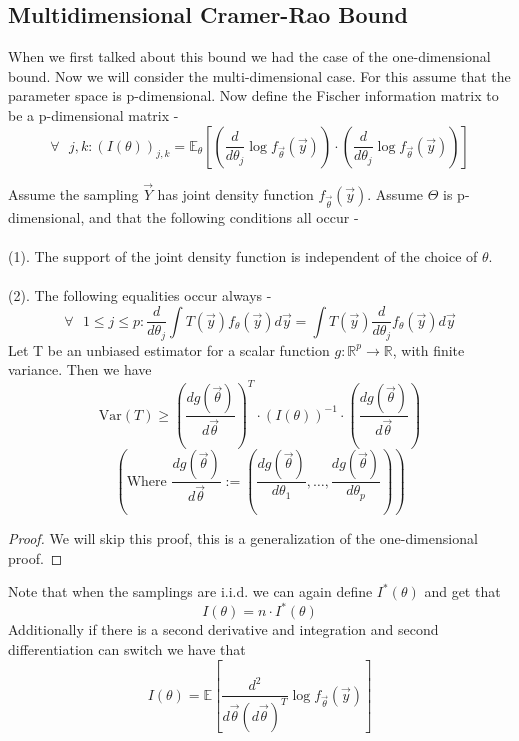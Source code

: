 \documentclass[../main.tex]{subfiles}
\begin{document}
\subsection{Multidimensional Cramer-Rao Bound}
When we first talked about this bound we had the case of the one-dimensional bound. Now we will consider the multi-dimensional case. For this assume that the parameter space is p-dimensional. Now define the Fischer information matrix to be a p-dimensional matrix - 
\[\forall\text{ }j,k: \left(I(\theta)\right)_{j,k} = \mathbb{E}_\theta\left[\left(\frac{d}{d\theta_j}\log f_{\overrightarrow{\theta}}(\overrightarrow{y})\right)\cdot\left(\frac{d}{d\theta_j}\log f_{\overrightarrow{\theta}}(\overrightarrow{y})\right)\right]\]
\begin{theorem}
Assume the sampling $\overrightarrow{Y}$ has joint density function $f_{\overrightarrow{\theta}}(\overrightarrow{y})$. Assume $\Theta$ is p-dimensional, and that the following conditions all occur - \\\\
(1). The support of the joint density function is independent of the choice of $\theta$. \\\\
(2). The following equalities occur always - 
\[\forall \text{ } 1\leq j\leq p: \frac{d}{d\theta_j}\int T(\overrightarrow{y})f_{\theta}(\overrightarrow{y})d\overrightarrow{y} = \int T(\overrightarrow{y})\frac{d}{d\theta_j} f_{\theta}(\overrightarrow{y})d\overrightarrow{y}\]
Let T be an unbiased estimator for a scalar function $g:\mathbb{R}^p\rightarrow\mathbb{R}$, with finite variance. Then we have
\[\text{Var}(T)\geq \left(\frac{dg(\overrightarrow{\theta})}{d\overrightarrow{\theta}}\right)^T \cdot \left(I(\theta)\right)^{-1}\cdot \left(\frac{dg(\overrightarrow{\theta})}{d\overrightarrow{\theta}}\right)\]
\[\left(
\text{Where     }\frac{dg(\overrightarrow{\theta})}{d\overrightarrow{\theta}}:=\left(\frac{dg(\overrightarrow{\theta})}{d\theta_1},\dots, \frac{dg(\overrightarrow{\theta})}{d\theta_p}\right)\right)\]
\end{theorem}
\begin{proof}
We will skip this proof, this is a generalization of the one-dimensional proof. 
\end{proof}
Note that when the samplings are i.i.d. we can again define $I^*(\theta)$ and get that
\[I(\theta) = n\cdot I^*(\theta)\]
Additionally if there is a second derivative and integration and second differentiation can switch we have that 
\[I(\theta) = \mathbb{E}\left[\frac{d^2}{d\overrightarrow{\theta}(d\overrightarrow{\theta})^T} \log f_{\overrightarrow{\theta}}(\overrightarrow{y})\right]\]
\end{document}
